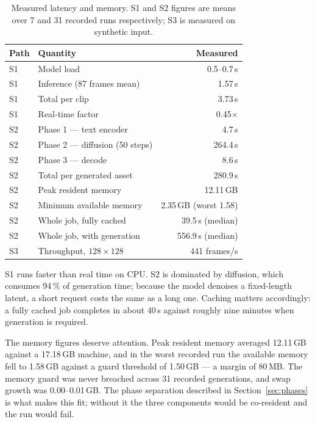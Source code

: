 \documentclass[conference]{IEEEtran}
\begin{document}
\begin{table}[t]
\caption{Measured latency and memory. S1 and S2 figures are means over 7 and 31
recorded runs respectively; S3 is measured on synthetic input.}
\label{tab:latency}
\centering
\small
\begin{tabular}{@{}llr@{}}
\toprule
\textbf{Path} & \textbf{Quantity} & \textbf{Measured} \\
\midrule
S1 & Model load & 0.5--0.7\,s \\
S1 & Inference (87 frames mean) & 1.57\,s \\
S1 & Total per clip & 3.73\,s \\
S1 & Real-time factor & 0.45$\times$ \\
\midrule
S2 & Phase 1 --- text encoder & 4.7\,s \\
S2 & Phase 2 --- diffusion (50 steps) & 264.4\,s \\
S2 & Phase 3 --- decode & 8.6\,s \\
S2 & Total per generated asset & 280.9\,s \\
S2 & Peak resident memory & 12.11\,GB \\
S2 & Minimum available memory & 2.35\,GB (worst 1.58) \\
S2 & Whole job, fully cached & 39.5\,s (median) \\
S2 & Whole job, with generation & 556.9\,s (median) \\
\midrule
S3 & Throughput, $128\times128$ & 441 frames/s \\
\bottomrule
\end{tabular}
\end{table}

S1 runs faster than real time on CPU. S2 is dominated by diffusion, which
consumes 94\,\% of generation time; because the model denoises a fixed-length
latent, a short request costs the same as a long one. Caching matters
accordingly: a fully cached job completes in about 40\,s against roughly nine
minutes when generation is required.

The memory figures deserve attention. Peak resident memory averaged 12.11\,GB
against a 17.18\,GB machine, and in the worst recorded run the available memory
fell to 1.58\,GB against a guard threshold of 1.50\,GB --- a margin of 80\,MB.
The memory guard was never breached across 31 recorded generations, and swap
growth was 0.00--0.01\,GB. The phase separation described in
Section~\ref{sec:phases} is what makes this fit; without it the three components
would be co-resident and the run would fail.
\end{document}
